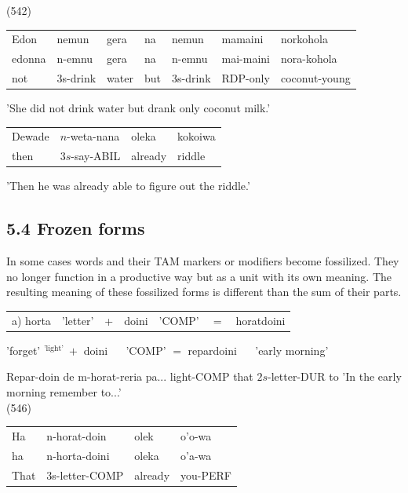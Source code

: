 \documentclass[10pt]{article}
\begin{document}
(542)

\begin{center}
\begin{tabular}{lllllll}
Edon & nemun & gera & na & nemun & mamaini & norkohola \\
edonna & n-emnu & gera & na & n-emnu & mai-maini & nora-kohola \\
not & 3s-drink & water & but & 3s-drink & RDP-only & coconut-young \\
\end{tabular}
\end{center}

'She did not drink water but drank only coconut milk.'

\begin{center}
\begin{tabular}{llll}
Dewade & \(n\)-weta-nana & oleka & kokoiwa \\
then & \(3 s\)-say-ABIL & already & riddle \\
\end{tabular}
\end{center}

'Then he was already able to figure out the riddle.'

\subsection*{5.4 Frozen forms}
In some cases words and their TAM markers or modifiers become fossilized. They no longer function in a productive way but as a unit with its own meaning. The resulting meaning of these fossilized forms is different than the sum of their parts.

\begin{center}
\begin{tabular}{lllllll}
a) horta & 'letter' & + & doini & 'COMP' & \(=\) & horatdoini \\
\end{tabular}
\end{center} 'forget' \({ }^{\text {'light' }}+\) doini \(\quad\) 'COMP' \(=\) repardoini \(\quad\) 'early morning'

Repar-doin de m-horat-reria pa... light-COMP that \(2 s\)-letter-DUR to 'In the early morning remember to...'\\
(546)

\begin{center}
\begin{tabular}{llll}
Ha & n-horat-doin & olek & o'o-wa \\
ha & n-horta-doini & oleka & o'a-wa \\
That & 3s-letter-COMP & already & you-PERF \\
\end{tabular}
\end{center}
\end{document}
